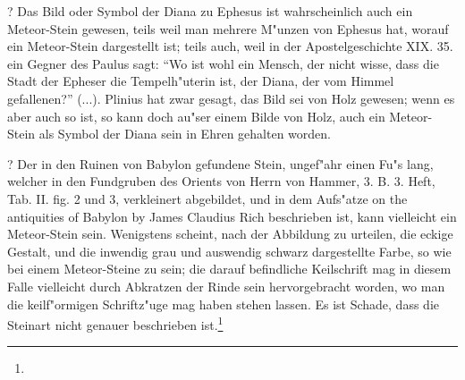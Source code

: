 \documentclass[a4paper, 11pt, oneside, polutonikogreek, german]{article}
\begin{document}
? Das Bild oder Symbol der Diana zu Ephesus ist wahrscheinlich auch ein Meteor-Stein gewesen, teils weil man mehrere M"unzen von Ephesus hat, worauf ein Meteor-Stein dargestellt ist; teils auch, weil in der Apostelgeschichte XIX. 35. ein Gegner des Paulus sagt: "`Wo ist wohl ein Mensch, der nicht wisse, dass die Stadt der Epheser die Tempelh"uterin ist, der Diana, der vom Himmel gefallenen?"' (...). Plinius hat zwar gesagt, das Bild sei von Holz gewesen; wenn es aber auch so ist, so kann doch au"ser einem Bilde von Holz, auch ein Meteor-Stein als Symbol der Diana sein in Ehren gehalten worden.

? Der in den Ruinen von Babylon gefundene Stein, ungef"ahr einen Fu"s lang, welcher in den Fundgruben des Orients von Herrn von Hammer, 3. B. 3. Heft, Tab. II. fig. 2 und 3, verkleinert abgebildet, und in dem Aufs"atze on the antiquities of Babylon by James Claudius Rich beschrieben ist, kann vielleicht ein Meteor-Stein sein. Wenigstens scheint, nach der Abbildung zu urteilen, die eckige Gestalt, und die inwendig grau und auswendig schwarz dargestellte Farbe, so wie bei einem Meteor-Steine zu sein; die darauf befindliche Keilschrift mag in diesem Falle vielleicht durch Abkratzen der Rinde sein hervorgebracht worden, wo man die keilf"ormigen Schriftz"uge mag haben stehen lassen. Es ist Schade, dass die Steinart nicht genauer beschrieben ist.\footnote{}
\end{document}
